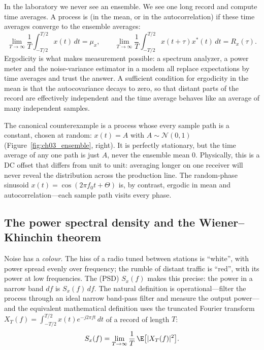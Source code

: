 In the laboratory we never see an ensemble. We see one long record and compute time averages. A
process is  (in the mean, or in the autocorrelation) if these time averages converge
to the ensemble averages:
\begin{equation}
\lim_{T\to\infty}\frac1T\int_{-T/2}^{T/2}x(t)\,dt=\mu_x,\qquad
\lim_{T\to\infty}\frac1T\int_{-T/2}^{T/2}x(t+\tau)x^*(t)\,dt=R_x(\tau).
\end{equation}
Ergodicity is what makes measurement possible: a spectrum analyzer, a power meter and the
noise-variance estimator in a modem all replace expectations by time averages and trust the answer.
A sufficient condition for ergodicity in the mean is that the autocovariance decays to zero, so that
distant parts of the record are effectively independent and the time average behaves like an average
of many independent samples.

The canonical counterexample is a process whose every sample path is a constant, chosen at random:
$x(t)=A$ with $A\sim\mathcal N(0,1)$ (Figure~\ref{fig:ch03_ensemble}, right). It is perfectly
stationary, but the time average of any one path is just $A$, never the ensemble mean 0. Physically,
this is a DC offset that differs from unit to unit: averaging longer on one receiver will never
reveal the distribution across the production line. The random-phase sinusoid
$x(t)=\cos(2\pi f_0t+\Theta)$ is, by contrast, ergodic in mean and autocorrelation---each sample path
visits every phase.

\subsection{The power spectral density and the Wiener--Khinchin theorem}
\label{sec:ch03:psd}

Noise has a \emph{colour}. The hiss of a radio tuned between stations is ``white'', with power spread
evenly over frequency; the rumble of distant traffic is ``red'', with its power at low frequencies. The
 (PSD) $S_x(f)$ makes this precise: the power in a narrow band $df$ is
$S_x(f)\,df$. The natural definition is operational---filter the process through an ideal narrow
band-pass filter and measure the output power---and the equivalent mathematical definition uses the
truncated Fourier transform $X_T(f)=\int_{-T/2}^{T/2}x(t)e^{-j2\pi ft}\,dt$ of a record of length $T$:
\begin{equation}
S_x(f)=\lim_{T\to\infty}\frac1T\,\E\big[|X_T(f)|^2\big].
\label{eq:ch03:psddef}
\end{equation}

